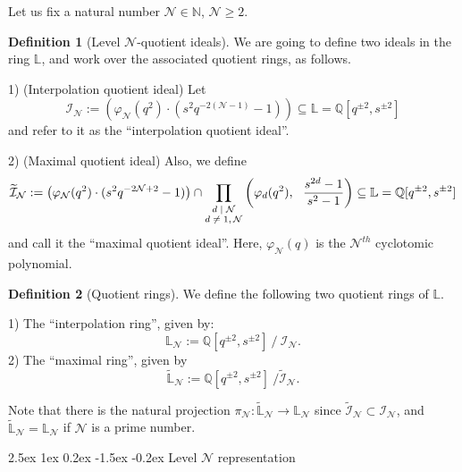 \documentclass[reqno,a4paper,11pt]{amsart}
\makeatletter
\numberwithin{equation}{section}
\numberwithin{figure}{section}
\theoremstyle{definition}
\newtheorem{defn}{Definition}[section]
\theoremstyle{plain}
\renewcommand*{\subsection}{\@startsection{subsection}{2}{\z@}%
	{2.5ex \@plus 1ex \@minus 0.2ex}%
	{-1.5ex \@plus -0.2ex}%
	{\normalfont\normalsize\bfseries}}
\newcommand{\Q}{\mathbb Q}
\newcommand{\Li}{{\mathbb L}}
\newcommand{\Liq}{\mathbb L}
\newcommand{\cI}{\mathcal{I}}
\newcommand{\cN}{\mathcal{N}}
\renewcommand{\geq}{\geqslant}
\makeatother
\begin{document}
Let us fix a natural number $\cN \in \mathbb N$, $\cN \geq 2$. 
\begin{defn}[Level $\cN$-quotient ideals] We are going to define two ideals in the ring $\Liq$, and work over the associated quotient rings, as follows.

1) (Interpolation quotient ideal) Let
\begin{equation}\label{qideal}
\cI_\cN:=\left(\varphi_\cN(q^2)\cdot (s^2q^{-2(\cN-1)}-1)\right)
\subseteq \Liq=\Q[q^{\pm2}, s^{\pm 2}]
\end{equation}
and refer to it as the ``interpolation quotient ideal''.

2) (Maximal quotient ideal) Also, we define 
\begin{equation}\label{idealm}
\widetilde{\cI}_\cN:=\left( \varphi_\cN(q^2) \cdot (s^2 q^{-2\cN+2} - 1)\right)  \cap \prod_{\text{\scriptsize$\begin{matrix}
 d\mid \cN \\ d \neq 1, \cN \end{matrix}$}}
 \left(\varphi_d(q^2),\ \  \frac{s^{2d}-1}{s^2-1} \right)
\subseteq \Liq=\Q[q^{\pm2}, s^{\pm 2}]
\end{equation}
and call it the ``maximal quotient ideal''. Here, $\varphi_\cN(q)$ is the $\cN^{th}$ cyclotomic polynomial.
\end{defn}
\begin{defn}[Quotient rings] We define the following two  quotient rings of $\Liq$.

1) The ``interpolation ring'', given by:
\begin{equation}
\Li_{\cN}:=\Q[q^{\pm2}, s^{\pm 2}] \ / \ \cI_\cN.
\end{equation}
2) The ``maximal ring'', given by
\begin{equation}\label{qring}
\widetilde{\Li}_{\cN}:=\Q[q^{\pm2}, s^{\pm 2}] \ / \widetilde{\cI}_\cN.
\end{equation}
\end{defn}
%
Note that there is the natural projection $\pi_{\cN} : \widetilde{\Li}_{\cN} \to {\Li}_{\cN}$ since $\widetilde{\cI}_\cN \subset {\cI}_\cN$, and $\widetilde{\Li}_{\cN} = {\Li}_{\cN}$ if $\cN$ is a prime number.  

\subsection{Level $\cN$ representation}
\end{document}
